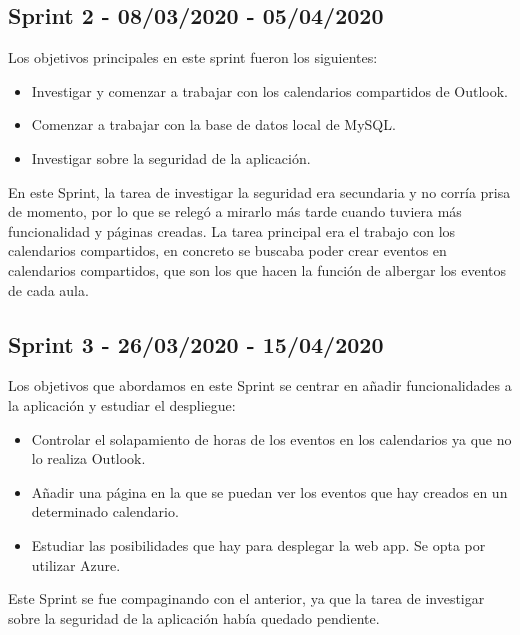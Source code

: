 \subsection{Sprint 2 - 08/03/2020 - 05/04/2020}
Los objetivos principales en este sprint fueron los siguientes:
\begin{itemize}
    \item Investigar y comenzar a trabajar con los calendarios compartidos de Outlook.
    \item Comenzar a trabajar con la base de datos local de MySQL.
    \item Investigar sobre la seguridad de la aplicación.
\end{itemize}
En este Sprint, la tarea de investigar la seguridad era secundaria y no corría prisa de momento, por lo que se relegó a mirarlo más tarde cuando tuviera más funcionalidad y páginas creadas. La tarea principal era el trabajo con los calendarios compartidos, en concreto se buscaba poder crear eventos en calendarios compartidos, que son los que hacen la función de albergar los eventos de cada aula.

\subsection{Sprint 3 - 26/03/2020 - 15/04/2020}
Los objetivos que abordamos en este Sprint se centrar en añadir funcionalidades a la aplicación y estudiar el despliegue:
\begin{itemize}
    \item Controlar el solapamiento de horas de los eventos en los calendarios ya que no lo realiza Outlook.
    \item Añadir una página en la que se puedan ver los eventos que hay creados en un determinado calendario.
    \item Estudiar las posibilidades que hay para desplegar la web app. Se opta por utilizar Azure.
\end{itemize}
Este Sprint se fue compaginando con el anterior, ya que la tarea de investigar sobre la seguridad de la aplicación había quedado pendiente.
